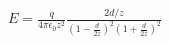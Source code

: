 \documentclass[preview]{standalone}
\begin{document}
\begin{align*}
E = \frac{q}{4\pi\epsilon_{0}z^{2}}  \frac{2d/z}{\left ( 1-\frac{d}{2z} \right )^{2}\left ( 1+\frac{d}{2z} \right )^{2}}
\end{align*}
\end{document}
